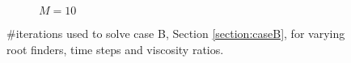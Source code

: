 \begin{figure}[!ht]
\begin{subfigure}[b]{0.49\textwidth}
%
\caption{$M =10$} \label{fig:spe10_iterations_perm_i_0_0_0_m_10_1_i_50_dt_40to150}
\end{subfigure}%
\caption{\#iterations used to solve case B, Section \ref{section:caseB}, for varying root finders, time steps and viscosity ratios.}
\label{fig:spe10_iterations_perm_i_0_0_0_i_50}
\end{figure}%
%
